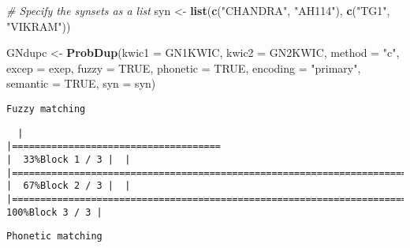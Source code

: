 \documentclass[
]{article}
\newenvironment{Shaded}{\begin{snugshade}}{\end{snugshade}}
\newcommand{\CommentTok}[1]{\textcolor[rgb]{0.56,0.35,0.01}{\textit{#1}}}
\newcommand{\DataTypeTok}[1]{\textcolor[rgb]{0.13,0.29,0.53}{#1}}
\newcommand{\KeywordTok}[1]{\textcolor[rgb]{0.13,0.29,0.53}{\textbf{#1}}}
\newcommand{\NormalTok}[1]{#1}
\newcommand{\OtherTok}[1]{\textcolor[rgb]{0.56,0.35,0.01}{#1}}
\newcommand{\StringTok}[1]{\textcolor[rgb]{0.31,0.60,0.02}{#1}}
\begin{document}
\begin{Shaded}
\begin{Highlighting}[]
\CommentTok{# Specify the synsets as a list}
\NormalTok{syn <-}\StringTok{ }\KeywordTok{list}\NormalTok{(}\KeywordTok{c}\NormalTok{(}\StringTok{"CHANDRA"}\NormalTok{, }\StringTok{"AH114"}\NormalTok{), }\KeywordTok{c}\NormalTok{(}\StringTok{"TG1"}\NormalTok{, }\StringTok{"VIKRAM"}\NormalTok{))}
\end{Highlighting}
\end{Shaded}

\begin{Shaded}
\begin{Highlighting}[]
\NormalTok{GNdupc <-}\StringTok{ }\KeywordTok{ProbDup}\NormalTok{(}\DataTypeTok{kwic1 =}\NormalTok{ GN1KWIC, }\DataTypeTok{kwic2 =}\NormalTok{ GN2KWIC, }\DataTypeTok{method =} \StringTok{"c"}\NormalTok{,}
                  \DataTypeTok{excep =}\NormalTok{ exep, }\DataTypeTok{fuzzy =} \OtherTok{TRUE}\NormalTok{, }\DataTypeTok{phonetic =} \OtherTok{TRUE}\NormalTok{,}
                  \DataTypeTok{encoding =} \StringTok{"primary"}\NormalTok{, }\DataTypeTok{semantic =} \OtherTok{TRUE}\NormalTok{, }\DataTypeTok{syn =}\NormalTok{ syn)}
\end{Highlighting}
\end{Shaded}

\begin{verbatim}
Fuzzy matching
\end{verbatim}

\begin{verbatim}
  |                                                                                                                       |=====================================                                                                          |  33%Block 1 / 3 |  |                                                                                                                       |==========================================================================                                     |  67%Block 2 / 3 |  |                                                                                                                       |===============================================================================================================| 100%Block 3 / 3 |
\end{verbatim}

\begin{verbatim}
Phonetic matching
\end{verbatim}
\end{document}
